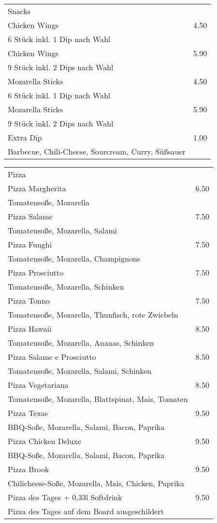 \documentclass[12pt]{article}
\makeatletter
\newcommand*\ColText[1]{\textcolor{Goldenrod3}{#1}}
\newenvironment{Group}[1]
  {\noindent\begin{tabular*}{\textwidth}{@{}p{.8\linewidth}@{\extracolsep{\fill}}r@{}}
    {\fontsize{24}{29}\selectfont\ColText{#1}}\\[0.8em]}
  {\end{tabular*}}
\newcommand*\Entry[2]{%
  \sffamily#1 & #2}
\newcommand*\Expl[1]{%
  \hspace*{1em}\footnotesize #1}
\makeatother
\begin{document}
\begin{Group}{Snacks}
\Entry{Chicken Wings}{4.50} \\
\Expl{6 Stück inkl. 1 Dip nach Wahl} \\
\Entry{Chicken Wings}{5.90} \\
\Expl{9 Stück inkl. 2 Dips nach Wahl} \\
\Entry{Mozarella Sticks}{4.50} \\
\Expl{6 Stück inkl. 1 Dip nach Wahl} \\
\Entry{Mozarella Sticks}{5.90} \\
\Expl{9 Stück inkl. 2 Dips nach Wahl} \\
\Entry{Extra Dip}{1.00} \\
\Expl{Barbecue, Chili-Cheese, Sourcream, Curry, Süßsauer} \\
\end{Group}

\vfill

\begin{Group}{Pizza}
\Entry{Pizza Margherita}{6.50} \\ 
\Expl{Tomatensoße, Mozarella} \\
\Entry{Pizza Salame}{7.50} \\ 
\Expl{Tomatensoße, Mozarella, Salami} \\
\Entry{Pizza Funghi}{7.50} \\ 
\Expl{Tomatensoße, Mozarella, Champignons} \\
\Entry{Pizza Prosciutto}{7.50} \\ 
\Expl{Tomatensoße, Mozarella, Schinken} \\
\Entry{Pizza Tonno}{7.50} \\ 
\Expl{Tomatensoße, Mozarella, Thunfisch, rote Zwiebeln} \\
\Entry{Pizza Hawaii}{8.50} \\ 
\Expl{Tomatensoße, Mozarella, Ananas, Schinken} \\
\Entry{Pizza Salame e Prosciutto}{8.50} \\ 
\Expl{Tomatensoße, Mozarella, Salami, Schinken} \\
\Entry{Pizza Vegetariana}{8.50} \\ 
\Expl{Tomatensoße, Mozarella, Blattspinat, Mais, Tomaten} \\
\Entry{Pizza Texas}{9.50} \\ 
\Expl{BBQ-Soße, Mozarella, Salami, Bacon, Paprika} \\
\Entry{Pizza Chicken Deluxe}{9.50} \\ 
\Expl{BBQ-Soße, Mozarella, Salami, Bacon, Paprika} \\
\Entry{Pizza Brook}{9.50} \\ 
\Expl{Chilicheese-Soße, Mozarella, Mais, Chicken, Paprika} \\
\Entry{Pizza des Tages + 0,33l Softdrink}{9.50}\\ 
\Expl{Pizza des Tages auf dem Board ausgeschildert} \\

\end{Group}
\end{document}
